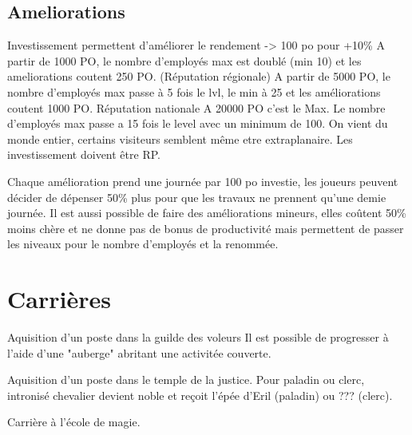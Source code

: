 \subsection*{Ameliorations}

Investissement permettent d'améliorer le rendement -> 100 po pour +10\%
A partir de 1000 PO, le nombre d'employés max est doublé (min 10) et les
ameliorations coutent 250 PO. (Réputation régionale)
A partir de 5000 PO, le nombre d'employés max passe à 5 fois le lvl, le min
à 25 et les améliorations coutent 1000 PO. Réputation nationale
A 20000 PO c'est le Max. Le nombre d'employés max passe a 15 fois le level
avec un minimum de 100. On vient du monde entier, certains visiteurs 
semblent même etre extraplanaire. Les investissement doivent être RP.

Chaque amélioration prend une journée par 100 po investie, les joueurs peuvent décider 
de dépenser 50\% plus pour que les travaux ne prennent qu'une demie journée. Il est 
aussi possible de faire des améliorations mineurs, elles coûtent 50\% moins chère
et ne donne pas de bonus de productivité mais permettent de passer les niveaux pour
le nombre d'employés et la renommée.

\section*{Carrières}

Aquisition d'un poste dans la guilde des voleurs
Il est possible de progresser à l'aide d'une "auberge" abritant une activitée couverte.

Aquisition d'un poste dans le temple de la justice.
Pour paladin ou clerc, intronisé chevalier devient noble et reçoit l'épée d'Eril (paladin) ou ??? (clerc).

Carrière à l'école de magie.



